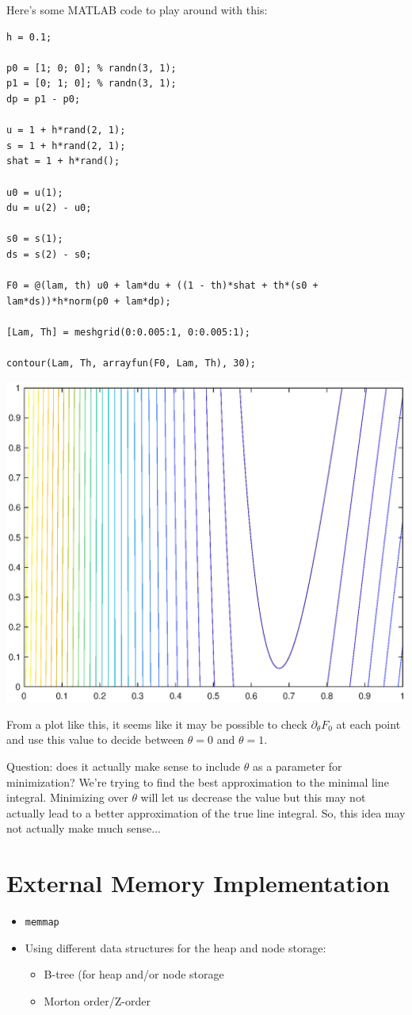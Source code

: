 \documentclass[eikonal.tex]{subfiles}
\begin{document}
Here's some MATLAB code to play around with this:

\begin{verbatim}
h = 0.1;

p0 = [1; 0; 0]; % randn(3, 1);
p1 = [0; 1; 0]; % randn(3, 1);
dp = p1 - p0;

u = 1 + h*rand(2, 1);
s = 1 + h*rand(2, 1);
shat = 1 + h*rand();

u0 = u(1);
du = u(2) - u0;

s0 = s(1);
ds = s(2) - s0;

F0 = @(lam, th) u0 + lam*du + ((1 - th)*shat + th*(s0 + lam*ds))*h*norm(p0 + lam*dp);

[Lam, Th] = meshgrid(0:0.005:1, 0:0.005:1);

contour(Lam, Th, arrayfun(F0, Lam, Th), 30);
\end{verbatim}

\begin{center}
  \includegraphics[width=0.6\linewidth]{saddle.eps}
\end{center}

From a plot like this, it seems like it may be possible to check
$\partial_\theta F_0$ at each point and use this value to decide
between $\theta = 0$ and $\theta = 1$.

Question: does it actually make sense to include $\theta$ as a
parameter for minimization? We're trying to find the best
approximation to the minimal line integral. Minimizing over $\theta$
will let us decrease the value but this may not actually lead to a
better approximation of the true line integral. So, this idea may not
actually make much sense...

\section{External Memory Implementation}
\begin{itemize}
\item \texttt{memmap}
\item Using different data structures for the heap and node storage:
  \begin{itemize}
  \item B-tree (for heap and/or node storage
  \item Morton order/Z-order
  \end{itemize}
\end{itemize}
\end{document}
